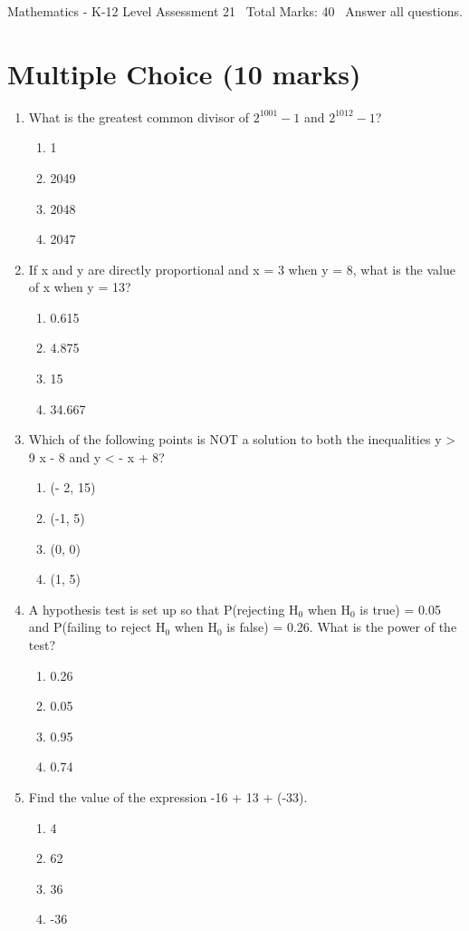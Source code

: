 \documentclass[12pt]{article}
\begin{document}
\begin{center}
Mathematics - K-12 Level Assessment 21 \
Total Marks: 40 \
Answer all questions.
\end{center}

\section*{Multiple Choice (10 marks)}
\begin{enumerate}[label=\arabic*.]
\item What is the greatest common divisor of $2^{1001}-1$ and $2^{1012}-1$?
\begin{enumerate}[label=(\alph*)]
    \item 1
    \item 2049
    \item 2048
    \item 2047
\end{enumerate}
\item If x and y are directly proportional and x = 3 when y = 8, what is the value of x when y = 13?
\begin{enumerate}[label=(\alph*)]
    \item 0.615
    \item 4.875
    \item 15
    \item 34.667
\end{enumerate}
\item Which of the following points is NOT a solution to both the inequalities y \textgreater{} 9 x - 8 and y \textless{} - x + 8?
\begin{enumerate}[label=(\alph*)]
    \item (- 2, 15)
    \item (-1, 5)
    \item (0, 0)
    \item (1, 5)
\end{enumerate}
\item A hypothesis test is set up so that P(rejecting H$_{0}$ when H$_{0}$ is true) = 0.05 and P(failing to reject H$_{0}$ when H$_{0}$ is false) = 0.26. What is the power of the test?
\begin{enumerate}[label=(\alph*)]
    \item 0.26
    \item 0.05
    \item 0.95
    \item 0.74
\end{enumerate}
\item Find the value of the expression -16 + 13 + (-33).
\begin{enumerate}[label=(\alph*)]
    \item 4
    \item 62
    \item 36
    \item -36
\end{enumerate}
\end{enumerate}
\end{document}

